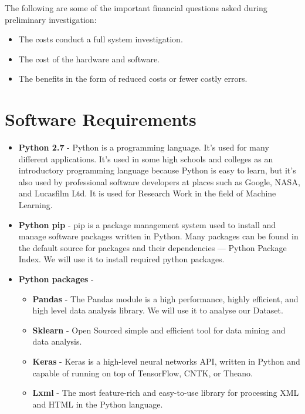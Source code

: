 The following are some of the important financial questions asked during preliminary investigation:
\begin{itemize}
    \item The costs conduct a full system investigation.
    \item The cost of the hardware and software.
    \item The benefits in the form of reduced costs or fewer costly errors.
\end{itemize}


\section{Software Requirements}
\begin{itemize}
    \item \textbf{Python 2.7} - Python is a programming language. It’s used for many different applications. It’s used in some high schools and colleges as an introductory programming language because Python is easy to learn, but it’s also used by professional software developers at places such as Google, NASA, and Lucasfilm Ltd. It is used for Research Work in the field of Machine Learning. 
    \item \textbf{Python pip} - pip is a package management system used to install and manage software packages written in Python. Many packages can be found in the default source for packages and their dependencies — Python Package Index. We will use it to install required python packages.
    \item \textbf{Python packages} - 
        \begin{itemize}
            \item \textbf{Pandas} - The Pandas module is a high performance, highly efficient, and high level data analysis library. We will use it to analyse our Dataset.
            \item \textbf{Sklearn} - Open Sourced simple and efficient tool for data mining and data analysis.
            \item \textbf{Keras} - Keras is a high-level neural networks API, written in Python and capable of running on top of TensorFlow, CNTK, or Theano.
            \item \textbf{Lxml} -  The most feature-rich and easy-to-use library for processing XML and HTML in the Python language.
        \end{itemize}
\end{itemize}

